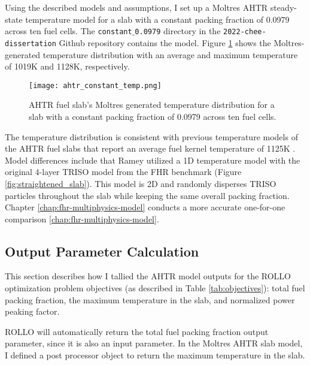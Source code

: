 Using the described models and assumptions, I set up a Moltres AHTR steady-state 
temperature model for a slab with a constant packing fraction of 0.0979 across ten 
fuel cells. 
The \texttt{constant$\_$0.0979} directory in the \texttt{2022-chee-dissertation} 
Github repository contains the model. %
Figure \ref{fig:ahtr_constant_temp} shows the Moltres-generated temperature 
distribution with an average and maximum temperature of 1019K and 1128K, 
respectively.
\begin{figure}[H]
    \centering
    \texttt{[image: ahtr\_constant\_temp.png]}
    \caption{AHTR fuel slab's Moltres generated temperature distribution for a 
    slab with a constant packing fraction of 0.0979 across ten fuel cells.}  
    \label{fig:ahtr_constant_temp}
\end{figure}
The temperature distribution is consistent with previous temperature models of 
the AHTR fuel slabs that report an average fuel kernel temperature of 1125K 
\cite{ramey_methodology_2021}. 
Model differences include that Ramey \cite{ramey_methodology_2021} utilized a 
1D temperature model with the original 4-layer TRISO model from the FHR benchmark 
(Figure \ref{fig:straightened_slab}).
This model is 2D and randomly disperses TRISO particles throughout the 
slab while keeping the same overall packing fraction. 
Chapter \ref{chap:fhr-multiphysics-model} conducts a more accurate one-for-one 
comparison \ref{chap:fhr-multiphysics-model}.


\subsection{Output Parameter Calculation}
\label{sec:ahtr_slab_output}
This section describes how I tallied the AHTR model outputs for the ROLLO 
optimization problem objectives (as described in Table \ref{tab:objectives}):
total fuel packing fraction, the maximum temperature in the slab, and 
normalized power peaking factor.  

ROLLO will automatically return the total fuel packing fraction output parameter, 
since it is also an input parameter. 
In the Moltres AHTR slab model, I defined a post processor object to return the 
maximum temperature in the slab. 

